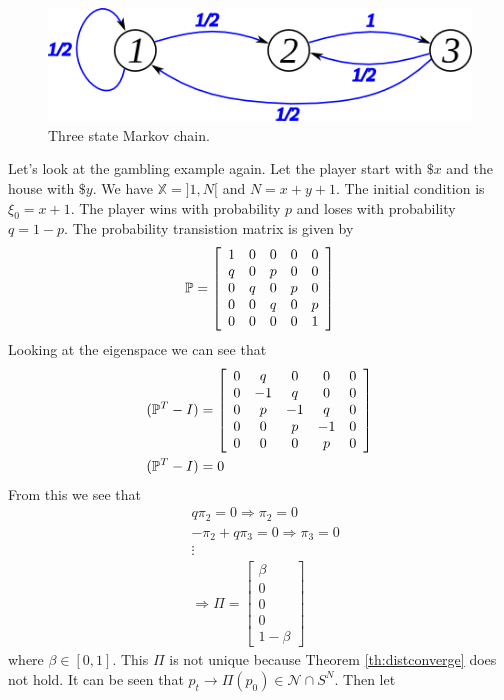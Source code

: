 \begin{figure}[ht!]
	\centering
	\includegraphics[width=.4\textwidth]{images/10mc3b}
	\caption{Three state Markov chain.}
	\label{fig:10mc3b}
\end{figure}

\begin{example}
\label{ex:gambling}
Let's look at the gambling example again. Let the player start with $\$x$ and the house with $\$y$. We have $\mathbb{X}=]1,N[$ and $N=x+y+1$. The initial condition is $\xi_0=x+1$. The player wins with probability $p$ and loses with probability $q=1-p$. The probability transistion matrix is given by
$$\mathbb{P} = \left[\begin{array}{c c c c c} 1 & 0 & 0 & 0 & 0 \\ q & 0 & p & 0 & 0 \\ 0 & q & 0 & p & 0 \\ 0 & 0 & q & 0 & p \\ 0 & 0 & 0 & 0 & 1 \end{array}\right]$$
Looking at the eigenspace we can see that
\begin{align*}
&(\mathbb{P}^T-I) = \left[\begin{array}{c c c c c} 0 & q & 0 & 0 & 0 \\ 0 & -1 & q & 0 & 0 \\ 0 & p & -1 & q & 0 \\ 0 & 0 & p & -1 & 0 \\ 0 & 0 & 0 & p & 0 \end{array}\right] \\
&(\mathbb{P}^T-I) = 0
\end{align*}
From this we see that
\begin{align*}
&q\pi_2 = 0 \Rightarrow \pi_2=0 \\
&-\pi_2+q\pi_3 = 0 \Rightarrow \pi_3=0 \\
&\vdots \\
&\Rightarrow \Pi = \left[\begin{array}{c} \beta \\ 0 \\ 0 \\ 0 \\ 1-\beta \end{array}\right]
\end{align*}
where $\beta\in[0,1]$. This $\Pi$ is not unique because Theorem \ref{th:distconverge} does not hold. It can be seen that $p_t\rightarrow \Pi(p_0)\in\mathcal{N}\cap S^N$. Then let

\end{example}
